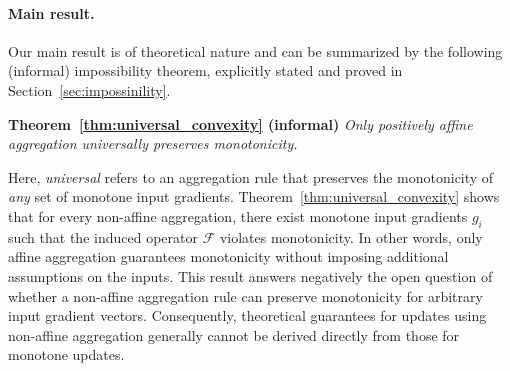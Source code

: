 \documentclass[twoside,11pt]{article}
\newcommand{\F}{\mathcal{F}}
\let\todo\relax%
\newcommand{\comm}[3][inline]{\todo[#1, size=\tiny]{#2: #3}}
\newcommand{\batodo}[2][inline]{\comm[color=magenta,#1]{BL}{#2}}
\newcommand{\au}[1]{\textcolor{green!80!black}{#1}}
\begin{document}
\paragraph{Main result.}
Our main result is of theoretical nature and can be summarized by the following (informal) impossibility theorem, explicitly stated and proved in Section~\ref{sec:impossinility}.  

\begin{mdframed}[backgroundcolor=gray!5]
\vspace{0.5\topsep}    
\textbf{Theorem~\ref{thm:universal_convexity} (informal)} \emph{Only positively affine aggregation universally preserves monotonicity.}
\vspace{0.5\topsep}
\end{mdframed}
\noindent Here, \emph{universal} refers to an aggregation rule that preserves the monotonicity of \emph{any} set of monotone input gradients. 
Theorem~\ref{thm:universal_convexity} shows that for every non-affine aggregation, there exist monotone input gradients $g_i$ such that the induced operator $\F$ violates monotonicity. 
In other words, only affine aggregation guarantees monotonicity without imposing additional assumptions on the inputs.
This result answers negatively the open question of whether a non-affine aggregation rule can preserve monotonicity for arbitrary input gradient vectors. 
Consequently, theoretical guarantees for updates using non-affine aggregation generally cannot be derived directly from those for monotone updates.
\end{document}
